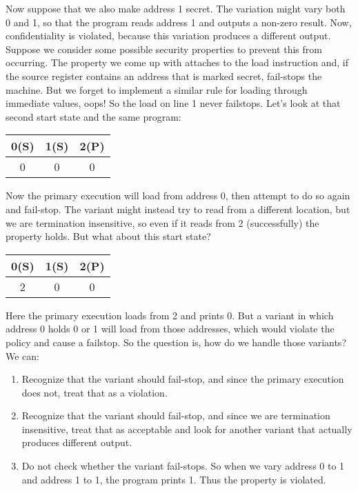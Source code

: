 \documentclass{article}
\begin{document}
Now suppose that we also make address 1 secret. The variation might vary both 0 and 1, so that the
program reads address 1 and outputs a non-zero result. Now, confidentiality is violated, because this
variation produces a different output. Suppose we consider some possible security properties to
prevent this from occurring. The property we come up with attaches to the load instruction and,
if the source register contains an address that is marked secret, fail-stops the machine. But we forget
to implement a similar rule for loading through immediate values, oops! So the load on line 1 never failstops.
Let's look at that second start state and the same program:

\begin{tabular}{| c | c | c |}
  \hline
  0(S) & 1(S) & 2(P) \\
  \hline
  0 & 0 & 0 \\
  \hline
\end{tabular}

Now the primary execution will load from address 0, then attempt to do so again and fail-stop. The variant
might instead try to read from a different location, but we are termination insensitive, so even if it reads
from 2 (successfully) the property holds. But what about this start state?

\begin{tabular}{| c | c | c |}
  \hline
  0(S) & 1(S) & 2(P) \\
  \hline
  2 & 0 & 0 \\
  \hline
\end{tabular}

Here the primary execution loads from 2 and prints 0. But a variant in which address 0 holds 0 or 1 will
load from those addresses, which would violate the policy and cause a failstop. So the question is, how do
we handle those variants? We can:

\begin{enumerate}
\item Recognize that the variant should fail-stop, and since the primary execution does not,
  treat that as a violation.
\item Recognize that the variant should fail-stop, and since we are termination insensitive,
  treat that as acceptable and look for another variant that actually produces different output.
\item Do not check whether the variant fail-stops. So when we vary address 0 to 1 and address 1 to 1,
  the program prints 1. Thus the property is violated.
\end{enumerate}
\end{document}
